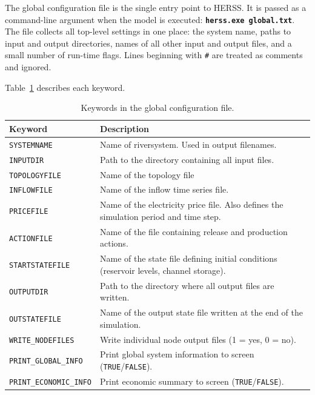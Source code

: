 \documentclass[a4paper, 12pt]{report}
\newcommand{\cmd}[1]{\textbf{\texttt{#1}}}
\begin{document}
	The global configuration file is the single entry point to HERSS. It is passed as a
	command-line argument when the model is executed: \cmd{herss.exe global.txt}. 
	The file collects all top-level settings in one place: the system name, 
	paths to input and output directories, names of all other input and 
	output files, and a small number of run-time flags. 
	Lines beginning with \texttt{\#} are treated as comments and ignored.

	Table~\ref{tab:globalconfig} describes each keyword.

	\begin{table}[h]
	\centering
	\caption{Keywords in the global configuration file.}
	\label{tab:globalconfig}
	\begin{tabular}{lp{9cm}}
		\hline
		\textbf{Keyword} & \textbf{Description} \\
		\hline
		\texttt{SYSTEMNAME}         & Name of riversystem. Used in output filenames. \\
		\texttt{INPUTDIR}           & Path to the directory containing all input files. \\
		\texttt{TOPOLOGYFILE}       & Name of the topology file \\
		\texttt{INFLOWFILE}         & Name of the inflow time series file. \\
		\texttt{PRICEFILE}          & Name of the electricity price file. Also defines the simulation period and time step. \\
		\texttt{ACTIONFILE}         & Name of the file containing release and production actions. \\
		\texttt{STARTSTATEFILE}     & Name of the state file defining initial conditions (reservoir levels, channel storage). \\
		\texttt{OUTPUTDIR}          & Path to the directory where all output files are written. \\
		\texttt{OUTSTATEFILE}       & Name of the output state file written at the end of the simulation. \\
		\texttt{WRITE\_NODEFILES}   & Write individual node output files (1 = yes, 0 = no). \\
		\texttt{PRINT\_GLOBAL\_INFO}   & Print global system information to screen (\texttt{TRUE}/\texttt{FALSE}). \\
		\texttt{PRINT\_ECONOMIC\_INFO} & Print economic summary to screen (\texttt{TRUE}/\texttt{FALSE}). \\
		\hline
	\end{tabular}
	\end{table}
\end{document}
